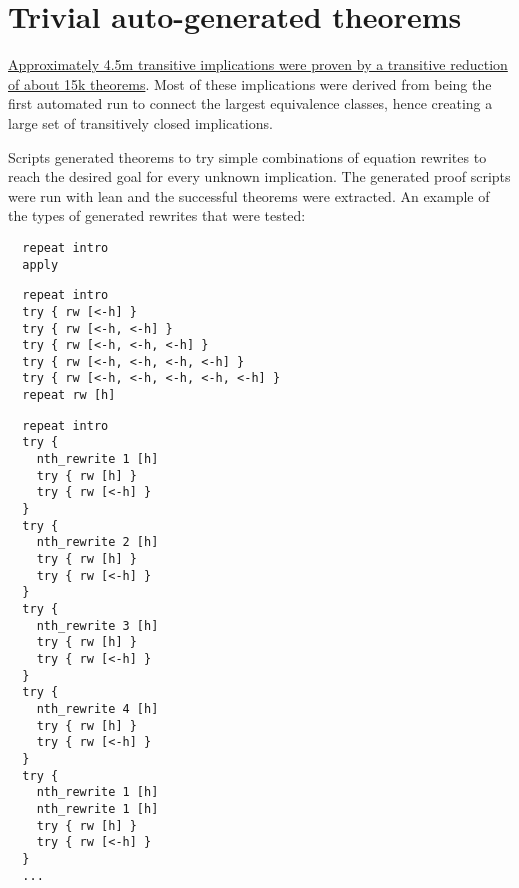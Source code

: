 \chapter{Trivial auto-generated theorems}

\href{https://github.com/teorth/equational_theories/tree/main/equational_theories/Generated/TrivialBruteforce}{Approximately 4.5m transitive implications were proven by a transitive reduction of about 15k theorems}. Most of these implications were derived from being the first automated run to connect the largest equivalence classes, hence creating a large set of transitively closed implications.

Scripts generated theorems to try simple combinations of equation rewrites to reach the desired goal for every unknown implication. The generated proof scripts were run with lean and the successful theorems were extracted. An example of the types of generated rewrites that were tested:

\begin{verbatim}
  repeat intro
  apply
\end{verbatim}

\begin{verbatim}
  repeat intro
  try { rw [<-h] }
  try { rw [<-h, <-h] }
  try { rw [<-h, <-h, <-h] }
  try { rw [<-h, <-h, <-h, <-h] }
  try { rw [<-h, <-h, <-h, <-h, <-h] }
  repeat rw [h]
\end{verbatim}

\begin{verbatim}
  repeat intro
  try {
    nth_rewrite 1 [h]
    try { rw [h] }
    try { rw [<-h] }
  }
  try {
    nth_rewrite 2 [h]
    try { rw [h] }
    try { rw [<-h] }
  }
  try {
    nth_rewrite 3 [h]
    try { rw [h] }
    try { rw [<-h] }
  }
  try {
    nth_rewrite 4 [h]
    try { rw [h] }
    try { rw [<-h] }
  }
  try {
    nth_rewrite 1 [h]
    nth_rewrite 1 [h]
    try { rw [h] }
    try { rw [<-h] }
  }
  ...
\end{verbatim}
